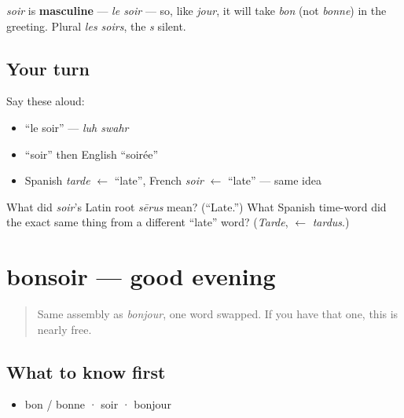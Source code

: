 \begin{grammarlens}[title={Grammar Lens}]
\emph{soir} is \textbf{masculine} — \emph{le soir} — so, like \emph{jour}, it will take \emph{bon} (not \emph{bonne}) in the greeting. Plural \emph{les soirs}, the \emph{s} silent.
\end{grammarlens}

\subsection*{Your turn}
Say these aloud:

\begin{itemize}
\raggedright
  \item \textquotedblleft{}le soir\textquotedblright{} — \emph{luh swahr}
  \item \textquotedblleft{}soir\textquotedblright{} then English \textquotedblleft{}soirée\textquotedblright{}
  \item Spanish \emph{tarde} $\leftarrow$ \textquotedblleft{}late\textquotedblright{}, French \emph{soir} $\leftarrow$ \textquotedblleft{}late\textquotedblright{} — same idea
\end{itemize}

\begin{tcolorbox}[breakable,colback=teal!4,colframe=teal!35!black,title={Before you move on}]
What did \emph{soir}'s Latin root \emph{sērus} mean? (\textquotedblleft{}Late.\textquotedblright{}) What Spanish time-word did the exact same thing from a different \textquotedblleft{}late\textquotedblright{} word? (\emph{Tarde}, $\leftarrow$ \emph{tardus}.)
\end{tcolorbox}
\section[bonsoir]{bonsoir — good evening}

\label{lesson:FR-C01-bonsoir}



\begin{quote}
Same assembly as \emph{bonjour}, one word swapped. If you have that one, this is nearly free.
\end{quote}

\subsection*{What to know first}
\begin{itemize}
\raggedright
  \item bon / bonne · soir · bonjour
\end{itemize}

